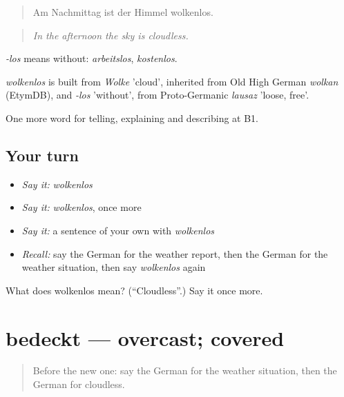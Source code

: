 \begin{quote}
Am Nachmittag ist der Himmel wolkenlos.
\end{quote}

\begin{quote}
\emph{In the afternoon the sky is cloudless.}
\end{quote}

\emph{-los} means without: \emph{arbeitslos}, \emph{kostenlos}.

\begin{cousinweb}
\emph{wolkenlos} is built from \emph{Wolke} 'cloud', inherited from Old High German \emph{wolkan} (EtymDB), and \emph{-los} 'without', from Proto-Germanic \emph{lausaz} 'loose, free'.
\end{cousinweb}

\begin{grammarlens}[title={What you've built}]
One more word for telling, explaining and describing at B1.
\end{grammarlens}

\subsection*{Your turn}
\begin{itemize}
\raggedright
  \item \emph{Say it:} \emph{wolkenlos}
  \item \emph{Say it:} \emph{wolkenlos}, once more
  \item \emph{Say it:} a sentence of your own with \emph{wolkenlos}
  \item \emph{Recall:} say the German for the weather report, then the German for the weather situation, then say \emph{wolkenlos} again
\end{itemize}

\begin{tcolorbox}[breakable,colback=teal!4,colframe=teal!35!black,title={Before you move on}]
What does wolkenlos mean? (\textquotedblleft{}Cloudless\textquotedblright{}.) Say it once more.
\end{tcolorbox}
\section[bedeckt]{bedeckt — overcast; covered}

\label{lesson:GE-C460-bedeckt}



\begin{quote}
Before the new one: say the German for the weather situation, then the German for cloudless.
\end{quote}

